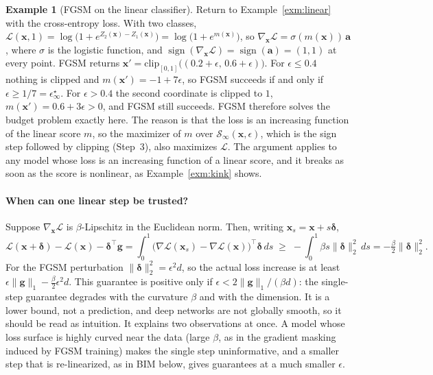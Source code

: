 \documentclass[10pt,a4paper]{extarticle}
\theoremstyle{definition}
\newtheorem{example}{Example}[section]
\newcommand{\Loss}{\mathcal{L}}
\newcommand{\x}{\mathbf{x}}
\newcommand{\xadv}{\mathbf{x}'}
\newcommand{\bdelta}{\boldsymbol{\delta}}
\DeclareMathOperator{\sign}{sign}
\begin{document}
\begin{example}[FGSM on the linear classifier]\label{exm:fgsm}
Return to Example~\ref{exm:linear} with the cross-entropy loss. With two classes, \(\Loss(\x,1)=\log\big(1+e^{Z_2(\x)-Z_1(\x)}\big)=\log\big(1+e^{m(\x)}\big)\), so \(\nabla_{\x}\Loss=\sigma(m(\x))\,\mathbf{a}\), where \(\sigma\) is the logistic function, and \(\sign(\nabla_{\x}\Loss)=\sign(\mathbf{a})=(1,1)\) at every point. FGSM returns \(\xadv=\mathrm{clip}_{[0,1]}\big((0.2+\epsilon,\,0.6+\epsilon)\big)\). For \(\epsilon\le0.4\) nothing is clipped and \(m(\xadv)=-1+7\epsilon\), so FGSM succeeds if and only if \(\epsilon\ge1/7=\epsilon^\star_\infty\). For \(\epsilon>0.4\) the second coordinate is clipped to \(1\), \(m(\xadv)=0.6+3\epsilon>0\), and FGSM still succeeds. FGSM therefore solves the budget problem exactly here. The reason is that the loss is an increasing function of the linear score \(m\), so the maximizer of \(m\) over \(\mathcal{S}_\infty(\x,\epsilon)\), which is the sign step followed by clipping (Step~3), also maximizes \(\Loss\). The argument applies to any model whose loss is an increasing function of a linear score, and it breaks as soon as the score is nonlinear, as Example~\ref{exm:kink} shows.
\end{example}

\paragraph{When can one linear step be trusted?} Suppose \(\nabla_{\x}\Loss\) is \(\beta\)-Lipschitz in the Euclidean norm. Then, writing \(\x_s=\x+s\bdelta\),
\[
\Loss(\x+\bdelta)-\Loss(\x)-\bdelta^\top\mathbf{g}=\int_0^1\big(\nabla\Loss(\x_s)-\nabla\Loss(\x)\big)^\top\bdelta\,ds\;\ge\;-\int_0^1\beta s\|\bdelta\|_2^2\,ds=-\tfrac{\beta}{2}\|\bdelta\|_2^2 .
\]
For the FGSM perturbation \(\|\bdelta\|_2^2=\epsilon^2d\), so the actual loss increase is at least \(\epsilon\|\mathbf{g}\|_1-\tfrac{\beta}{2}\epsilon^2d\). This guarantee is positive only if \(\epsilon<2\|\mathbf{g}\|_1/(\beta d)\): the single-step guarantee degrades with the curvature \(\beta\) and with the dimension. It is a lower bound, not a prediction, and deep networks are not globally smooth, so it should be read as intuition. It explains two observations at once. A model whose loss surface is highly curved near the data (large \(\beta\), as in the gradient masking induced by FGSM training) makes the single step uninformative, and a smaller step that is re-linearized, as in BIM below, gives guarantees at a much smaller \(\epsilon\).
\end{document}
